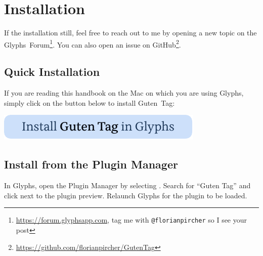 \chapter{Installation}%
\label{cha:installation}

If the installation still, feel free to reach out to me by opening a new topic on the Glyphs~Forum\footnote{\url{https://forum.glyphsapp.com}, tag me with \texttt{@florianpircher} so I see your post}.
You can also open an issue on GitHub\footnote{\url{https://github.com/florianpircher/GutenTag}}.

\section{Quick Installation}%
\label{sec:quick_installation}

If you are reading this handbook on the Mac on which you are using Glyphs, simply click on the button below to install Guten~Tag:

\bigbreak\noindent%
\href{https://florianpircher.com/glyphs/plugins/guten-tag/install}{%
  \includegraphics{Images/Install Guten Tag in Glyphs.pdf}}

\section{Install from the Plugin Manager}%
\label{sec:install_from_the_plugin_manager}

In Glyphs, open the Plugin Manager by selecting .
Search for \enquote{Guten Tag} and click  next to the plugin preview.
Relaunch Glyphs for the plugin to be loaded.

\bigbreak\noindent{}%
\vspace{-22em}
